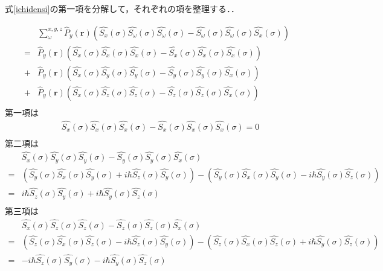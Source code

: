 \documentclass{article}
\begin{document}
式\eqref{ichidensi}の第一項を分解して，それぞれの項を整理する．．

\begin{equation}
\begin{split}
\label{}
&\sum_{\omega}^{x,y,z} {\hat{P}_y}{(\boldsymbol{r})} \left( {\hat{S_x}}(\sigma) \hat{S_{\omega}}{(\sigma)} \hat{S_{\omega}}{(\sigma)} -  \hat{S_{\omega}}{(\sigma)} \hat{S_{\omega}}{(\sigma)} {\hat{S_x}}(\sigma)\right)\\
=& {\hat{P}_y}{(\boldsymbol{r})} \left( {\hat{S_x}}(\sigma) \hat{S_{x}}{(\sigma)} \hat{S_{x}}{(\sigma)} -  \hat{S_{x}}{(\sigma)} \hat{S_{x}}{(\sigma)} {\hat{S_x}}(\sigma)\right)\\
+&{\hat{P}_y}{(\boldsymbol{r})} \left( {\hat{S_x}}(\sigma) \hat{S_{y}}{(\sigma)} \hat{S_{y}}{(\sigma)} -  \hat{S_{y}}{(\sigma)} \hat{S_{y}}{(\sigma)} {\hat{S_x}}(\sigma)\right)\\
+&{\hat{P}_y}{(\boldsymbol{r})} \left( {\hat{S_x}}(\sigma) \hat{S_{z}}{(\sigma)} \hat{S_{z}}{(\sigma)} -  \hat{S_{z}}{(\sigma)} \hat{S_{z}}{(\sigma)} {\hat{S_x}}(\sigma)\right)\\
\end{split}
\end{equation}
第一項は
\begin{equation}
\begin{split}
\label{}
&{\hat{S_x}}(\sigma) \hat{S_{x}}{(\sigma)} \hat{S_{x}}{(\sigma)} -  \hat{S_{x}}{(\sigma)} \hat{S_{x}}{(\sigma)} {\hat{S_x}}(\sigma)=0 \\
\end{split}
\end{equation}
第二項は
\begin{equation}
\begin{split}
\label{}
&{\hat{S_x}}(\sigma) \hat{S_{y}}{(\sigma)} \hat{S_{y}}{(\sigma)} -  \hat{S_{y}}{(\sigma)} \hat{S_{y}}{(\sigma)} {\hat{S_x}}(\sigma) \\
=&\left({\hat{S_y}}(\sigma) \hat{S_{x}}{(\sigma)} \hat{S_{y}}{(\sigma)}+i\hbar \hat{S_z}{(\sigma)}\hat{S_{y}}{(\sigma)}\right) - \left( \hat{S_{y}}{(\sigma)} \hat{S_{x}}{(\sigma)} {\hat{S_y}}(\sigma) -i\hbar  \hat{S_{y}}{(\sigma)} \hat{S_{z}}{(\sigma)} \right)\\
=& i\hbar \hat{S_z}{(\sigma)}\hat{S_{y}}{(\sigma)} +i\hbar \hat{S_y}{(\sigma)}\hat{S_{z}}{(\sigma)} \\
\end{split}
\end{equation}
第三項は
\begin{equation}
\begin{split}
\label{}
&{\hat{S_x}}(\sigma) \hat{S_{z}}{(\sigma)} \hat{S_{z}}{(\sigma)} -  \hat{S_{z}}{(\sigma)} \hat{S_{z}}{(\sigma)} {\hat{S_x}}(\sigma) \\
=&\left({\hat{S_z}}(\sigma) \hat{S_{x}}{(\sigma)} \hat{S_{z}}{(\sigma)}-i\hbar \hat{S_z}{(\sigma)}\hat{S_{y}}{(\sigma)}\right) - \left( \hat{S_{z}}{(\sigma)} \hat{S_{x}}{(\sigma)} {\hat{S_z}}(\sigma) +i\hbar  \hat{S_{y}}{(\sigma)} \hat{S_{z}}{(\sigma)} \right)\\
=& -i\hbar \hat{S_z}{(\sigma)}\hat{S_{y}}{(\sigma)} -i\hbar \hat{S_y}{(\sigma)}\hat{S_{z}}{(\sigma)} \\
\end{split}
\end{equation}
\end{document}

